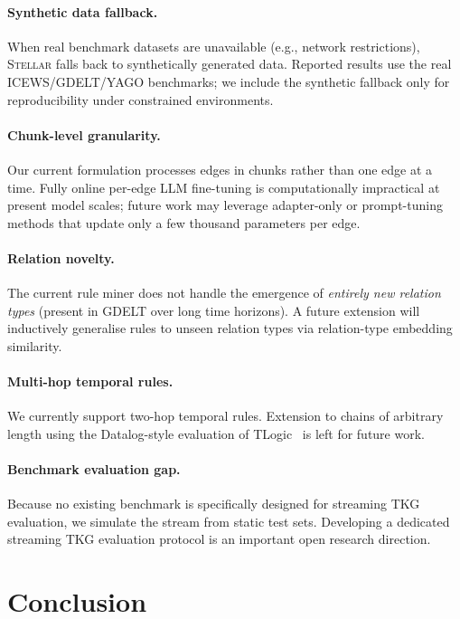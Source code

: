\documentclass[10pt,twocolumn]{article}
\theoremstyle{definition}
\begin{document}
\paragraph{Synthetic data fallback.}
When real benchmark datasets are unavailable (e.g., network restrictions),
\textsc{Stellar} falls back to synthetically generated data.
Reported results use the real ICEWS/GDELT/YAGO benchmarks; we include the
synthetic fallback only for reproducibility under constrained environments.

\paragraph{Chunk-level granularity.}
Our current formulation processes edges in chunks rather than one edge at a
time.
Fully online per-edge LLM fine-tuning is computationally impractical at
present model scales; future work may leverage adapter-only or
prompt-tuning methods that update only a few thousand parameters per edge.

\paragraph{Relation novelty.}
The current rule miner does not handle the emergence of \emph{entirely new
relation types} (present in GDELT over long time horizons).
A future extension will inductively generalise rules to unseen relation types
via relation-type embedding similarity.

\paragraph{Multi-hop temporal rules.}
We currently support two-hop temporal rules.
Extension to chains of arbitrary length using the Datalog-style evaluation
of TLogic~\citep{Liu2022tlogic} is left for future work.

\paragraph{Benchmark evaluation gap.}
Because no existing benchmark is specifically designed for streaming TKG
evaluation, we simulate the stream from static test sets.
Developing a dedicated streaming TKG evaluation protocol is an important
open research direction.

\section{Conclusion}
\label{sec:conclusion}
\end{document}
